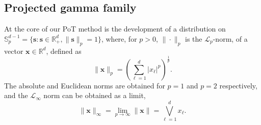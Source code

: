 \subsection{Projected gamma family\label{subsec:projgamma}}

At the core of our PoT method is the development of a distribution 
    on ${\mathbb S}_{p}^{d-1}=\{\bm{s} : \bm{s} \in 
    {\mathbb R}_{+}^{d}, \| \bm{s}\|_{p} = 1\}$, where, for $p>0$, $\|\cdot\|_p$ is 
    the $\mathcal{L}_p$-norm, of a vector $\bm{x}\in {\mathbb R}^d$, defined as
    \[
        \lVert \bm{x} \rVert_p = 
        \left({\textstyle\sum}_{\ell = 1}^d \lvert x_{\ell}\rvert^p\right)^{\frac{1}{p}}.
    \]
    The absolute and Euclidean norms are obtained for $p=1$ and $p=2$ respectively,
    and the $\mathcal{L}_{\infty}$ norm can be obtained as a limit, 
    \[
        \| \bm{x} \|_{\infty}
            = \lim\limits_{p\to\infty} \| \bm{x} \|
            = \underset{\ell = 1}{\overset{d}{\bigvee}}x_{\ell}.
    \]
  
